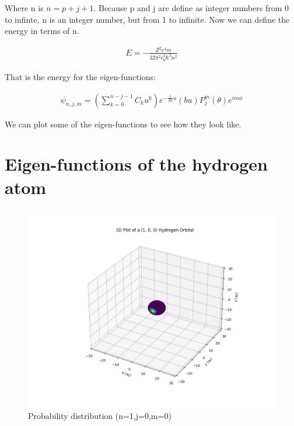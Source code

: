 Where n is $n=p+j+1$. Because p and j are define as integer numbers from 0 to infinte, n is an integer number, but from 1 to infinite. Now we can define the energy in terms of n.

\begin{equation}
  \begin{array}{c}
    E = -\frac{Z^2 e^4 m}{32\pi^2\epsilon_0^2\hbar^2 n^2}
  \end{array}
\end{equation}

That is the energy for the eigen-functions:

\begin{equation}
  \begin{array}{c}
    \psi_{n,j,m} = \left(\sum_{k=0}^{n-j-1} C_k u^k \right)e^{-\frac{1}{2n}u}(bu)P_j^m(\theta)e^{im\phi}
  \end{array}
\end{equation}

We can plot some of the eigen-functions to see how they look like.

\section{Eigen-functions of the hydrogen atom}


\begin{figure}
  \centering
  \includegraphics{images9/3d_plot_1,0,0.png}
  \caption{Probability distribution (n=1,j=0,m=0)}
\end{figure}

